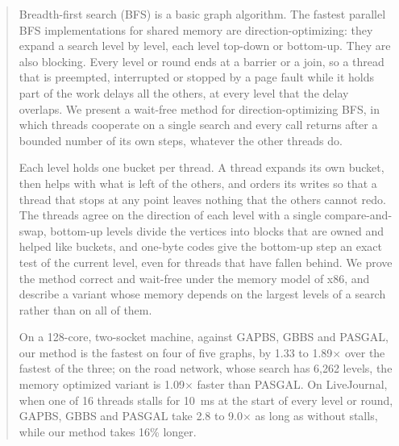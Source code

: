 \begin{abstract}
Breadth-first search (BFS) is a basic graph algorithm. The fastest parallel BFS implementations for shared memory are direction-optimizing: they expand a search level by level, each level top-down or bottom-up. They are also blocking. Every level or round ends at a barrier or a join, so a thread that is preempted, interrupted or stopped by a page fault while it holds part of the work delays all the others, at every level that the delay overlaps. We present a wait-free method for direction-optimizing BFS, in which threads cooperate on a single search and every call returns after a bounded number of its own steps, whatever the other threads do.

Each level holds one bucket per thread. A thread expands its own bucket, then helps with what is left of the others, and orders its writes so that a thread that stops at any point leaves nothing that the others cannot redo. The threads agree on the direction of each level with a single compare-and-swap, bottom-up levels divide the vertices into blocks that are owned and helped like buckets, and one-byte codes give the bottom-up step an exact test of the current level, even for threads that have fallen behind. We prove the method correct and wait-free under the memory model of x86, and describe a variant whose memory depends on the largest levels of a search rather than on all of them.

On a 128-core, two-socket machine, against GAPBS, GBBS and PASGAL, our method is the fastest on four of five graphs, by 1.33 to 1.89$\times$ over the fastest of the three; on the road network, whose search has 6,262 levels, the memory optimized variant is 1.09$\times$ faster than PASGAL. On LiveJournal, when one of 16 threads stalls for 10~ms at the start of every level or round, GAPBS, GBBS and PASGAL take 2.8 to 9.0$\times$ as long as without stalls, while our method takes 16\% longer.
\end{abstract}
